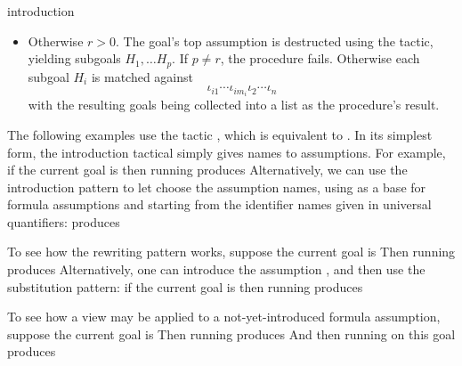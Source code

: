 \begin{tactic}[$\tau$=>$\;\iota_1 \cdots \iota_n$]{introduction}
\begin{tsyntax}[empty]{}
\begin{itemize}
\begin{itemize}
      \item Otherwise $r>0$. The goal's top assumption is destructed
        using the  tactic, yielding subgoals
        $H_1,\ldots H_p$.  If $p\neq r$, the procedure fails. Otherwise
        each subgoal $H_i$ is matched against
        \begin{displaymath}
          \iota_{i1}\cdots\iota_{i{m_i}}\iota_2\cdots \iota_n
        \end{displaymath}
        with the resulting goals being collected into a list as
        the procedure's result.
      \end{itemize}
    \end{itemize}

    The following examples use the tactic , which is
    equivalent to .
    In its simplest form, the introduction tactical simply gives names
    to assumptions.  For example, if the current goal is
    then running
    produces
    Alternatively, we can use the introduction pattern 
    to let \EasyCrypt choose the assumption names, using
     as a base for formula assumptions and starting
    from the identifier names given in universal quantifiers:
    produces

    To see how the \ec{->} rewriting pattern works, suppose
    the current goal is
    Then running
    produces
    Alternatively, one can introduce the assumption ,
    and then use the \ec{->>} substitution pattern:
    if the current goal is
    then running
    produces

    To see how a view may be applied to a not-yet-introduced formula
    assumption, suppose the current goal is
    Then running
    produces
    And then running
    on this goal produces


\end{tsyntax}
\end{tactic}
